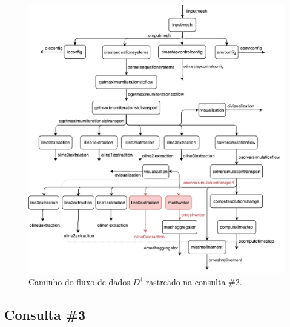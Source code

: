 \begin{figure}[htb]
    \centering
    \includegraphics[width=\textwidth]{img/experiments-dataflow-2}
    \caption[Caminho do fluxo de dados \(D^{\dagger}\) rastreado na consulta \#2]{Caminho do fluxo de dados \(D^{\dagger}\) rastreado na consulta \#2.}%
    \label{fig:experiments-dataflow-2}
\end{figure}

\subsection{Consulta \#3}

%

